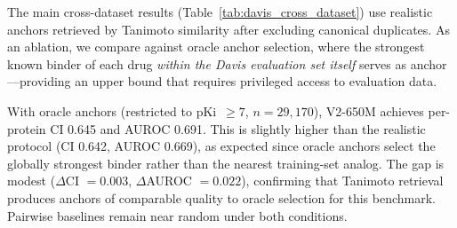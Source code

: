 The main cross-dataset results (Table~\ref{tab:davis_cross_dataset}) use realistic anchors retrieved by Tanimoto similarity after excluding canonical duplicates. As an ablation, we compare against oracle anchor selection, where the strongest known binder of each drug \emph{within the Davis evaluation set itself} serves as anchor---providing an upper bound that requires privileged access to evaluation data.

With oracle anchors (restricted to pKi~$\geq 7$, $n = 29{,}170$), V2-650M achieves per-protein CI 0.645 and AUROC 0.691. This is slightly higher than the realistic protocol (CI 0.642, AUROC 0.669), as expected since oracle anchors select the globally strongest binder rather than the nearest training-set analog. The gap is modest ($\Delta$CI $= 0.003$, $\Delta$AUROC $= 0.022$), confirming that Tanimoto retrieval produces anchors of comparable quality to oracle selection for this benchmark. Pairwise baselines remain near random under both conditions.

